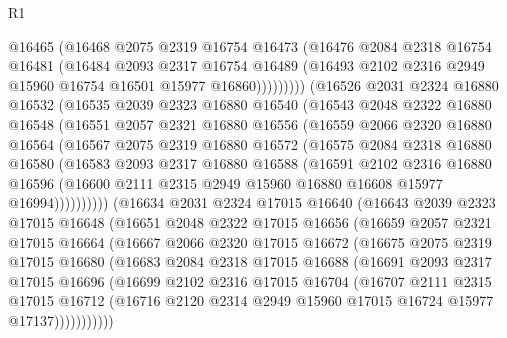 \begin{lexlean}{R1}
\begin{coremodule}
              @16465
              (@16468
                @2075
                @2319
                @16754
                @16473
                (@16476
                  @2084
                  @2318
                  @16754
                  @16481
                  (@16484
                    @2093
                    @2317
                    @16754
                    @16489
                    (@16493 @2102 @2316 @2949 @15960 @16754 @16501 @15977 @16860)))))))))
    (@16526
      @2031
      @2324
      @16880
      @16532
      (@16535
        @2039
        @2323
        @16880
        @16540
        (@16543
          @2048
          @2322
          @16880
          @16548
          (@16551
            @2057
            @2321
            @16880
            @16556
            (@16559
              @2066
              @2320
              @16880
              @16564
              (@16567
                @2075
                @2319
                @16880
                @16572
                (@16575
                  @2084
                  @2318
                  @16880
                  @16580
                  (@16583
                    @2093
                    @2317
                    @16880
                    @16588
                    (@16591
                      @2102
                      @2316
                      @16880
                      @16596
                      (@16600 @2111 @2315 @2949 @15960 @16880 @16608 @15977 @16994))))))))))
    (@16634
      @2031
      @2324
      @17015
      @16640
      (@16643
        @2039
        @2323
        @17015
        @16648
        (@16651
          @2048
          @2322
          @17015
          @16656
          (@16659
            @2057
            @2321
            @17015
            @16664
            (@16667
              @2066
              @2320
              @17015
              @16672
              (@16675
                @2075
                @2319
                @17015
                @16680
                (@16683
                  @2084
                  @2318
                  @17015
                  @16688
                  (@16691
                    @2093
                    @2317
                    @17015
                    @16696
                    (@16699
                      @2102
                      @2316
                      @17015
                      @16704
                      (@16707
                        @2111
                        @2315
                        @17015
                        @16712
                        (@16716 @2120 @2314 @2949 @15960 @17015 @16724 @15977 @17137)))))))))))

\end{coremodule}
\end{lexlean}
